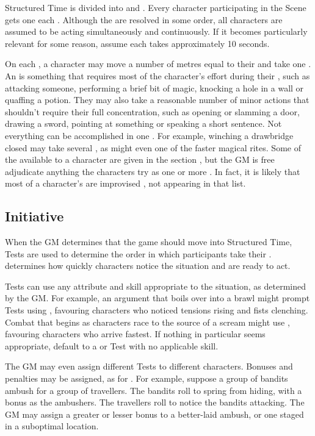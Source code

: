 Structured Time is divided into {\rounds} and {\turns}.
Every character participating in the Scene gets one {\turn} each {\round}.
Although the {\turns} are resolved in some order, all characters are assumed to be acting simultaneously and continuously.
If it becomes particularly relevant for some reason, assume each {\round} takes approximately 10 seconds.

On each {\turn}, a character may move a number of metres equal to their  and take one {\action}.
An {\action} is something that requires most of the character's effort during their {\turn}, such as attacking someone, performing a brief bit of magic, knocking a hole in a wall or quaffing a potion.
They may also take a reasonable number of minor actions that shouldn't require their full concentration, such as opening or slamming a door, drawing a sword, pointing at something or speaking a short sentence.
Not everything can be accomplished in one {\action}.
For example, winching a drawbridge closed may take several {\actions}, as might even one of the faster magical rites.
Some of the {\actions} available to a character are given in the section , but the GM is free adjudicate anything the characters try as one or more {\actions}.
In fact, it is likely that most of a character's {\actions} are improvised {\actions}, not appearing in that list.

\subsection{Initiative}

When the GM determines that the game should move into Structured Time, {\initiative} Tests are used to determine the order in which participants take their {\turns}.
{\initiative} determines how quickly characters notice the situation and are ready to act.

\capital{\initiative} Tests can use any attribute and skill appropriate to the situation, as determined by the GM.
For example, an argument that boils over into a brawl might prompt {\initiative} Tests using , favouring characters who noticed tensions rising and fists clenching.
Combat that begins as characters race to the source of a scream might use , favouring characters who arrive fastest.
If nothing in particular seems appropriate, default to a  or  Test with no applicable skill.

The GM may even assign different Tests to different characters.
Bonuses and penalties may be assigned, as for {\opposedtests}.
For example, suppose a group of bandits ambush for a group of travellers.
The bandits roll  to spring from hiding, with a  bonus as the ambushers.
The travellers roll  to notice the bandits attacking.
The GM may assign a greater or lesser bonus to a better-laid ambush, or one staged in a suboptimal location.


